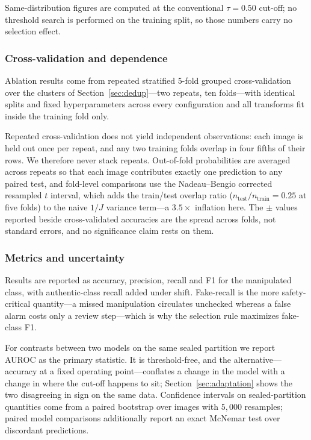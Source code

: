 \documentclass[journal]{IEEEtran}
\begin{document}
Same-distribution figures are computed at the conventional $\tau = 0.50$
cut-off; no threshold search is performed on the training split, so those
numbers carry no selection effect.

\subsubsection{Cross-validation and dependence}
Ablation results come from repeated stratified 5-fold grouped cross-validation
over the clusters of Section~\ref{sec:dedup}---two repeats, ten folds---with
identical splits and fixed hyperparameters across every configuration and all
transforms fit inside the training fold only.

Repeated cross-validation does not yield independent observations: each image
is held out once per repeat, and any two training folds overlap in four fifths
of their rows. We therefore never stack repeats. Out-of-fold probabilities are
averaged across repeats so that each image contributes exactly one prediction
to any paired test, and fold-level comparisons use the Nadeau--Bengio corrected
resampled $t$ interval, which adds the train/test overlap ratio
($n_{\text{test}}/n_{\text{train}} = 0.25$ at five folds) to the naive $1/J$
variance term---a $3.5\times$ inflation here. The $\pm$ values reported beside
cross-validated accuracies are the spread across folds, not standard errors,
and no significance claim rests on them.

\subsubsection{Metrics and uncertainty}
Results are reported as accuracy, precision, recall and F1 for the manipulated
class, with authentic-class recall added under shift. Fake-recall is the more
safety-critical quantity---a missed manipulation circulates unchecked whereas a
false alarm costs only a review step---which is why the selection rule
maximizes fake-class F1.

For contrasts between two models on the same sealed partition we report AUROC
as the primary statistic. It is threshold-free, and the alternative---accuracy
at a fixed operating point---conflates a change in the model with a change in
where the cut-off happens to sit; Section~\ref{sec:adaptation} shows the two
disagreeing in sign on the same data. Confidence intervals on sealed-partition
quantities come from a paired bootstrap over images with $5{,}000$ resamples;
paired model comparisons additionally report an exact McNemar test over
discordant predictions.
\end{document}
